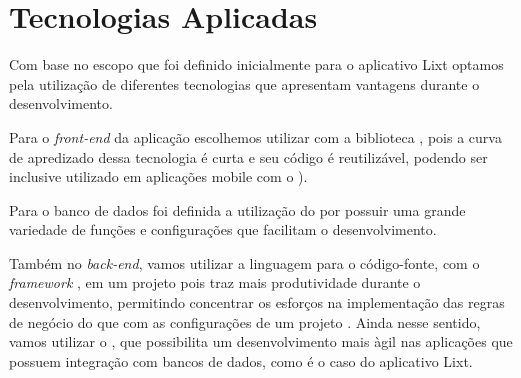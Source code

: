 \chapter{Tecnologias Aplicadas}

Com base no escopo que foi definido inicialmente para o aplicativo
Lixt optamos pela utilização de diferentes tecnologias que apresentam
vantagens durante o desenvolvimento.

Para o \textit{front-end} da aplicação escolhemos utilizar \DIFdelbegin \textit{} 
\DIFdelend \DIFaddbegin {}\DIFaddend com a biblioteca \DIFdelbegin \textit{}%
\DIFdelend \DIFaddbegin {}\DIFaddend , pois a curva de apredizado dessa tecnologia é
curta e seu código é reutilizável, podendo ser inclusive utilizado em
aplicações mobile com o \DIFdelbegin \textit{} %
\textit{} %
\textit{}%
\DIFdelend \DIFaddbegin {}\DIFaddend ).

Para o banco de dados foi definida a utilização do \DIFdelbegin \textit{} %
\DIFdelend \DIFaddbegin {}\DIFaddend por possuir
uma grande variedade de funções e configurações que facilitam o
desenvolvimento.

Também no \textit{back-end}, vamos utilizar a linguagem \DIFdelbegin \textit{} %
\DIFdelend \DIFaddbegin {}\DIFaddend para o código-fonte, com o \textit{framework} \DIFdelbegin \textit{}%
\DIFdelend \DIFaddbegin {}\DIFaddend , em um
projeto \DIFdelbegin \textit{}%
\textit{} %
\DIFdelend \DIFaddbegin {}\DIFaddend pois traz mais
produtividade durante o desenvolvimento, permitindo concentrar os
esforços na implementação das regras de negócio do que com as
configurações de um projeto \DIFdelbegin \textit{} %
\DIFdelend \DIFaddbegin {}\DIFaddend \cite{Alga2017}. Ainda nesse
sentido, vamos utilizar o \DIFdelbegin \textit{}%
\DIFdelend \DIFaddbegin {}\DIFaddend , que possibilita um
desenvolvimento mais àgil nas aplicações que possuem integração com
bancos de dados, como é o caso do aplicativo Lixt.
\DIFaddbegin 

 \DIFaddend